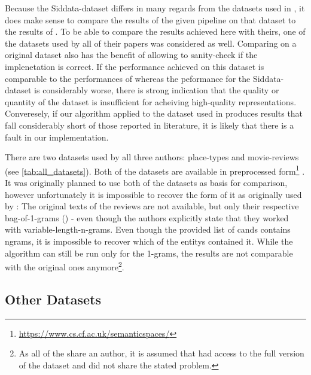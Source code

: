 Because the Siddata-dataset differs in many regards from the datasets used in \mainalgos, %
it does make sense to compare the results of the given pipeline on that dataset to the results of \mainalgos. To be able to compare the results achieved here with theirs, one of the datasets used by all of their papers was considered as well. Comparing on a original dataset also has the benefit of allowing to sanity-check if the implenetation is correct. If the performance achieved on this dataset is comparable to the performances of \mainalgos whereas the peformance for the Siddata-dataset is considerably worse, there is strong indication that the quality or quantity of the dataset is insufficient for acheiving high-quality representations. Converesely, if our algorithm applied to the dataset used in \mainalgos produces results that fall considerably short of those reported in literature, it is likely that there is a fault in our implementation.

There are two datasets used by all three authors: place-types and movie-reviews (see \autoref{tab:all_datasets}). Both of the datasets are available in preprocessed form\footnote{\url{https://www.cs.cf.ac.uk/semanticspaces/}} \cite{Derrac2015}. It was originally planned to use both of the datasets as basis for comparison, however unfortunately it is impossible to recover the form of it as originally used by \textcite{Derrac2015}: The original texts of the reviews are not available, but only their respective bag-of-1-grams () - even though the authors explicitly state that they worked with variable-length-n-grams. Even though the provided list of \glspl{cand} contains \glspl{ngram}, it is impossible to recover which of the \glspl{entity} contained it. While the algorithm can still be run only for the 1-grams, the results are not comparable with the original ones anymore\footnote{As all of the \mainalgos share an author, it is assumed that \cite{Alshaikh2020,Ager2018} had access to the full version of the dataset and did not share the stated problem.}.


\subsection{Other Datasets}



